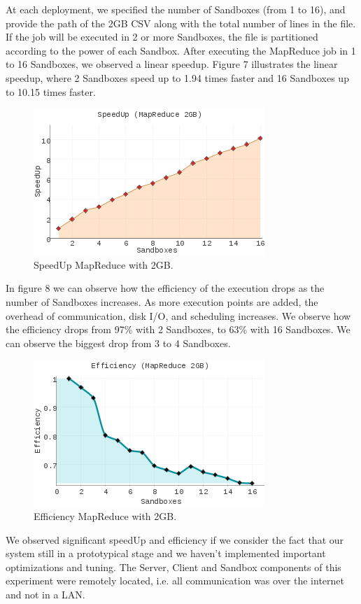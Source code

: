 \documentclass[10pt,reprint]{socc14}
\begin{document}
At each deployment, we specified the number of Sandboxes (from 1 to 16), and provide the path of the 2GB CSV along with the total number of lines in the file. If the job will be executed in 2 or more Sandboxes, the file is partitioned according to the power of each Sandbox. After executing the MapReduce job in 1 to 16 Sandboxes, we observed a linear speedup. Figure 7 illustrates the linear speedup, where 2 Sandboxes speed up to 1.94 times faster and 16 Sandboxes up to 10.15 times faster.

\begin{figure}	
	\centering
	\includegraphics[scale=2.5]{SpeedUpMapReduce2GB_small}
	\caption{SpeedUp MapReduce with 2GB.}
\end{figure}


In figure 8 we can observe how the efficiency of the execution drops as the number of Sandboxes increases. As more execution points are added, the overhead of communication, disk I/O, and scheduling increases. We observe how the efficiency drops from 97\% with 2 Sandboxes, to 63\% with 16 Sandboxes. We can observe the biggest drop from 3 to 4 Sandboxes.


\begin{figure}	
	\centering
	\includegraphics[scale=2.5]{EfficiencyMapReduce2GB_small}
	\caption{Efficiency MapReduce with 2GB.}
\end{figure}

We observed significant speedUp and efficiency if we consider the fact that our system still in a prototypical stage and we haven’t implemented important optimizations and tuning. The Server, Client and Sandbox components of this experiment were remotely located, i.e. all communication was over the internet and not in a LAN.
\end{document}
